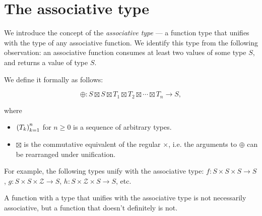 \section{The associative type}\label{section:the-associative-type}

We introduce the concept of the \emph{associative type} --- a function type
that unifies with the type of any associative function. We identify this type
from the following observation: an associative function consumes at least two
values of some type $S$, and returns a value of type $S$.

We define it formally as follows:

\[\oplus:S \boxtimes S \boxtimes T_1 \boxtimes T_2 \boxtimes \cdots \boxtimes
T_n \rightarrow S, \]

where

\begin{itemize}

\item $\left({T_k}\right)_{k=1}^n$ for $n\geq 0$ is a sequence of arbitrary types.

\item $\boxtimes$ is the commutative equivalent of the regular $\times$, i.e.
the arguments to $\oplus$ can be rearranged under unification.

\end{itemize}

For example, the following types unify with the associative type: $f:S \times S
\times S \rightarrow S$, $g:S \times S \times \mathcal{Z} \rightarrow S$, $h:S
\times \mathcal{Z} \times S \rightarrow S$, etc.

A function with a type that unifies with the associative type is not
necessarily associative, but a function that doesn't definitely is not.
